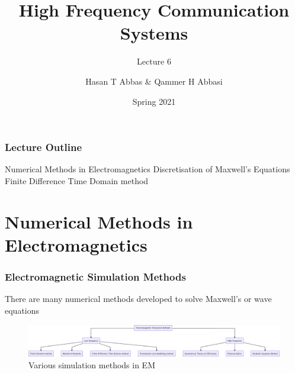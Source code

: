 \documentclass[10pt]{beamer}
\title{High Frequency Communication Systems}
\subtitle{Lecture 6}
\date{Spring 2021}
\author{Hasan T Abbas \& Qammer H Abbasi}
\begin{document}
\maketitle

\begin{frame}[fragile]
    \frametitle{Lecture Outline}
    \begin{outline}[itemize]
        \1 Numerical Methods in Electromagnetics
        \1 Discretisation of Maxwell's Equations
        \1 Finite Difference Time Domain method
    \end{outline}
\end{frame}

\section{Numerical Methods in Electromagnetics}




\begin{frame}
    \frametitle{Electromagnetic Simulation Methods}
    \begin{outline}
        \1 There are many numerical methods developed to solve Maxwell's or wave equations
    \end{outline}
    \begin{figure}[h!]
        \centering
        \includegraphics[width=1.0\textwidth]{em methods_1.pdf}
        \caption{Various simulation methods in EM}
    \end{figure}
\end{frame}
\end{document}
